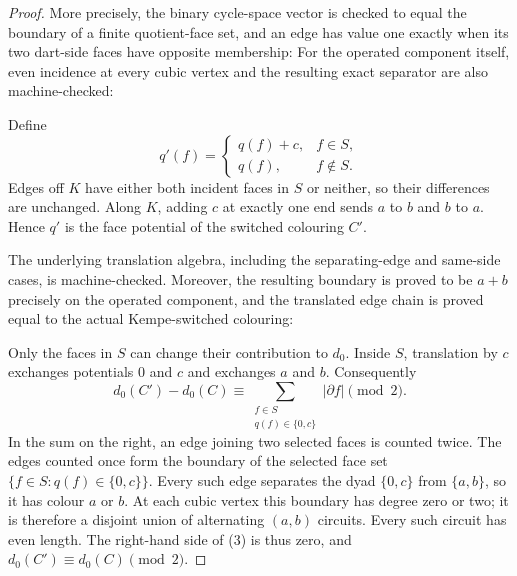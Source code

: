 \begin{proof}
More precisely, the binary cycle-space vector is checked to equal the
boundary of a finite quotient-face set, and an edge has value one exactly
when its two dart-side faces have opposite membership:
For the operated component itself, even incidence at every cubic vertex and
the resulting exact separator are also machine-checked:

Define
\[
 q'(f)=\begin{cases}
        q(f)+c,&f\in S,\\
        q(f),&f\notin S.
       \end{cases}
\]
Edges off $K$ have either both incident faces in $S$ or neither, so their
differences are unchanged.  Along $K$, adding $c$ at exactly one end sends
$a$ to $b$ and $b$ to $a$.  Hence $q'$ is the face potential of the
switched colouring $C'$.

The underlying translation algebra, including the separating-edge and
same-side cases, is machine-checked.  Moreover, the resulting boundary is
proved to be $a+b$ precisely on the operated component, and the translated
edge chain is proved equal to the actual Kempe-switched colouring:

Only the faces in $S$ can change their contribution to $d_0$.  Inside $S$,
translation by $c$ exchanges potentials $0$ and $c$ and exchanges $a$ and
$b$.  Consequently
\[
 d_0(C')-d_0(C)\equiv
 \sum_{\substack{f\in S\\q(f)\in\{0,c\}}}|\partial f|\pmod2.       \tag{3}
\]
In the sum on the right, an edge joining two selected faces is counted
twice.  The edges counted once form the boundary of the selected face set
$\{f\in S:q(f)\in\{0,c\}\}$.  Every such edge separates the dyad
$\{0,c\}$ from $\{a,b\}$, so it has colour $a$ or $b$.  At each cubic
vertex this boundary has degree zero or two; it is therefore a disjoint
union of alternating $(a,b)$ circuits.  Every such circuit has even length.
The right-hand side of (3) is thus zero, and
$d_0(C')\equiv d_0(C)\pmod2$.


\end{proof}
